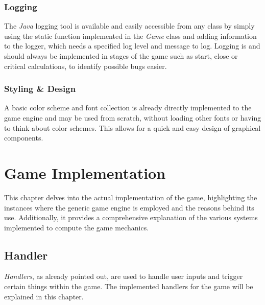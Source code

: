 \subsubsection{Logging}\label{subsubsec:logging}
The \textit{Java} logging tool is available and easily accessible from any class by simply using the static function
implemented in the \textit{Game} class and adding information to
the logger, which needs a specified log level and message to log.
Logging is and should always be implemented in stages of the game such as start, close or critical calculations, to identify possible bugs
easier.
\subsubsection{Styling \& Design}\label{subsubsec:styling-&-design}
A basic color scheme and font collection is already directly implemented to the game engine and may be used from scratch,
without loading other fonts or having to think about
color schemes.
This allows for a quick and easy design of graphical components.
\section{Game Implementation}\label{sec:game-implementation}
This chapter delves into the actual implementation of the game, highlighting the instances where the generic game engine is
employed and the reasons behind its use.
Additionally, it provides a comprehensive explanation of the various systems implemented to compute the game mechanics.
\subsection{Handler}\label{subsec:handler}
\textit{Handlers}, as already pointed out, are used to handle user inputs and trigger certain things within the game.
The implemented handlers for the game will be explained in this chapter.
